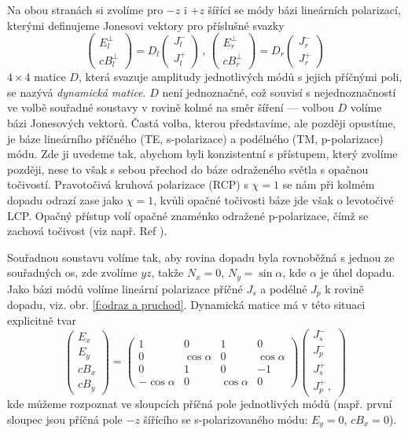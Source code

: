 Na obou stranách si zvolíme pro $-z$ i $+z$ šířící se módy bázi lineárních polarizací, kterými definujeme Jonesovi vektory pro příslušné svazky
\begin{equation}
\begin{pmatrix} E^\perp_l \\ cB^\perp_l \end{pmatrix}=D_l \begin{pmatrix} J^-_l \\ J^+_l \end{pmatrix} \,, \, 
\begin{pmatrix} E^\perp_r \\ cB^\perp_r \end{pmatrix}=D_r \begin{pmatrix} J^-_r \\ J^+_r \end{pmatrix}
\end{equation}
$4\times 4$ matice $D$, která svazuje amplitudy jednotlivých módů s jejich příčnými poli, se nazývá \emph{dynamická matice}.
$D$ není jednoznačné, což souvisí s nejednoznačností ve volbě souřadné soustavy v rovině kolmé na směr šíření --- volbou $D$ volíme bázi Jonesových vektorů.
Častá volba, kterou představíme, ale později opustíme, je báze lineárního příčného (TE, s-polarizace) a podélného (TM, p-polarizace) módu.
Zde ji uvedeme tak, abychom byli konzistentní s přístupem, který zvolíme později, nese to však s sebou přechod do báze odraženého světla s opačnou točivostí.
Pravotočivá kruhová polarizace (RCP) s $\chi=1$ se nám při kolmém dopadu odrazí zase jako $\chi=1$, kvůli opačné točivosti báze jde však o levotočivé LCP.
Opačný přístup volí opačné znaménko odražené p-polarizace, čímž se zachová točivost (viz např. Ref \cite{Silber}).

Souřadnou soustavu volíme tak, aby rovina dopadu byla rovnoběžná s jednou ze souřadných os, zde zvolíme $yz$, takže $N_x=0$, $N_y=\sin \alpha$, kde $\alpha$ je úhel dopadu.
Jako bázi módů volíme lineární polarizace příčné $J_s$ a podélné $J_p$ k rovině dopadu, viz. obr. \ref{f:odraz a pruchod}.
Dynamická matice má v této situaci explicitně tvar
\begin{equation}
\begin{pmatrix} E_x \\ E_y \\ cB_x \\ cB_y \end{pmatrix}
=\begin{pmatrix}
1 & 0 & 1 & 0 \\
0 & \cos\alpha & 0 & \cos\alpha \\
0 & 1 & 0 & -1 \\
-\cos\alpha & 0 & \cos\alpha & 0
\end{pmatrix}
\begin{pmatrix}
J^-_{s} \\ J^-_{p} \\ J^+_s \\ J^+_{p} \,,
\end{pmatrix}
\end{equation}
kde můžeme rozpoznat ve sloupcích příčná pole jednotlivých módů (např. první sloupec jsou příčná pole $-z$ šířícího se s-polarizovaného módu: $E_y=0$, $cB_x=0$).

